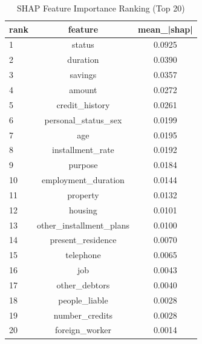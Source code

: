 \begin{table}
\centering
\caption{SHAP Feature Importance Ranking (Top 20)}
\label{tab:shap_ranking}
\begin{tabular}{lcc}
\toprule
rank & feature & mean_|shap| \\
\midrule
1 & status & 0.0925 \\
2 & duration & 0.0390 \\
3 & savings & 0.0357 \\
4 & amount & 0.0272 \\
5 & credit_history & 0.0261 \\
6 & personal_status_sex & 0.0199 \\
7 & age & 0.0195 \\
8 & installment_rate & 0.0192 \\
9 & purpose & 0.0184 \\
10 & employment_duration & 0.0144 \\
11 & property & 0.0132 \\
12 & housing & 0.0101 \\
13 & other_installment_plans & 0.0100 \\
14 & present_residence & 0.0070 \\
15 & telephone & 0.0065 \\
16 & job & 0.0043 \\
17 & other_debtors & 0.0040 \\
18 & people_liable & 0.0028 \\
19 & number_credits & 0.0028 \\
20 & foreign_worker & 0.0014 \\
\bottomrule
\end{tabular}
\end{table}
